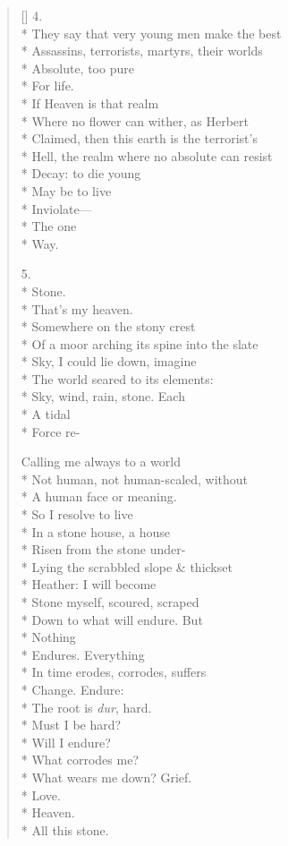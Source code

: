 \begin{verse}[\versewidth]
4.\\*
They say that very young men make the best\\*
Assassins, terrorists, martyrs, their worlds\\*
Absolute, too pure\\*
For life.\\*
If Heaven is that realm\\*
Where no flower can wither, as Herbert\\*
Claimed, then this earth is the terrorist's\\*
Hell, the realm where no absolute can resist\\*
Decay: to die young\\*
May be to live\\*
Inviolate---\\*
The one\\*
Way.

5.\\*
Stone.\\*
That's my heaven.\\*
Somewhere on the stony crest\\*
Of a moor arching its spine into the slate\\*
Sky, I could lie down, imagine\\*
The world seared to its elements:\\*
Sky, wind, rain, stone. Each\\*
A tidal\\*
Force re-

Calling me always to a world\\*
Not  human, not human-scaled, without\\*
A human face or meaning.\\*
So I resolve to live\\*
In a stone house, a house\\*
Risen from the stone under-\\*
Lying the scrabbled slope \& thickset\\*
Heather: I will become\\*
Stone myself, scoured, scraped\\*
Down to what will endure. But\\*
Nothing\\*
Endures. Everything\\*
In time erodes, corrodes, suffers\\*
Change. Endure:\\*
The root is \textit{dur}, hard.\\*
Must I be hard?\\*
Will I endure?\\*
What corrodes me?\\*
What wears me down?  Grief.\\*
Love. \\*
Heaven.\\*
All this stone.


\end{verse}
